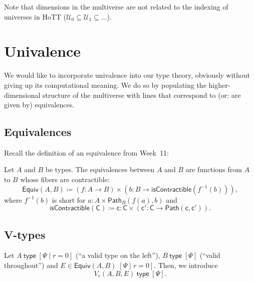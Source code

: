 \documentclass{article} \usepackage{chtt-notes} \usepackage{stmaryrd}
\newcommand{\itype}[1]{#1~\mathsf{type}}
\newcommand{\di}[1]{\;[#1]}
\newcommand{\ps}{\di{\Psi}}
\newcommand{\Path}{\mathsf{Path}}
\begin{document}
Note that dimensions in the multiverse are not related to the indexing of universes in HoTT ($\mathcal{U}_0 \subseteq \mathcal{U}_1 \subseteq \dots$).

\section{Univalence}
We would like to incorporate univalence into our type theory, obviously without giving up its computational meaning.
We do so by populating the higher-dimensional structure of the multiverse with lines that correspond to (or: are given by) equivalences.


\subsection{Equivalences}
Recall the definition of an equivalence from Week~11:
\begin{definition}[Equivalences]
    Let $A$ and $B$ be types.
    The equivalences between $A$ and $B$ are functions from $A$ to $B$ whose fibers are contractible:
    \[ \mathsf{Equiv}(A, B) \coloneqq (f : A \to B) \times (b : B \to \mathsf{isContractible}(f^{-1}(b))), \]
    where $f^{-1}(b)$ is short for $a : A \times \Path_{B}(f(a), b)$ and
    \[ \mathsf{isContractible(C) \coloneqq c : C \times (c' : C \to \Path(c, c'))}. \]
\end{definition}

\subsection{V-types}
Let $\itype{A}\;[\Psi \mid r = 0]$ (``a valid type on the left''), $\itype{B}\ps$ (``valid throughout'') and $E \in \mathsf{Equiv}(A, B)\;[\Psi \mid r = 0]$.
Then, we introduce
\[ \itype{V_r(A, B, E)}\ps. \]
\end{document}
